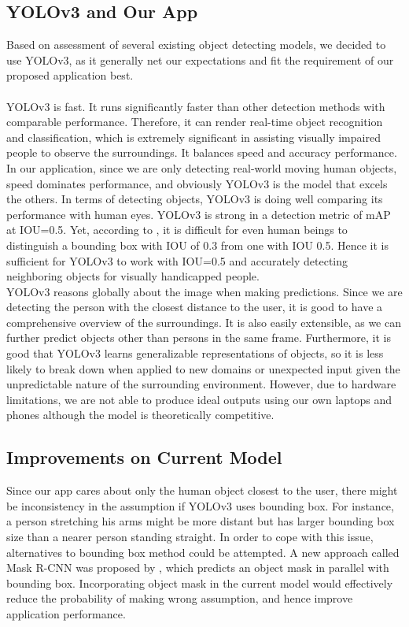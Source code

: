 \documentclass[letterpaper]{article} %
\begin{document}
\subsection{YOLOv3 and Our App}
Based on assessment of several existing object detecting models, we decided to use YOLOv3, as it generally net our expectations and fit the requirement of our proposed application best.\\
\\
\noindent YOLOv3 is fast. It runs significantly faster than other detection methods with comparable performance. Therefore, it can render real-time object recognition and classification, which is extremely significant in assisting visually impaired people to observe the surroundings. It balances speed and accuracy performance. In our application, since we are only detecting real-world moving human objects, speed dominates performance, and obviously YOLOv3 is the model that excels the others. In terms of detecting objects, YOLOv3 is doing well comparing its performance with human eyes. YOLOv3 is strong in a detection metric of mAP at IOU=0.5. Yet, according to \cite{Human-machine}, it is difficult for even human beings to distinguish a bounding box with IOU of 0.3 from one with IOU 0.5. Hence it is sufficient for YOLOv3 to work with IOU=0.5 and accurately detecting neighboring objects for visually handicapped people.\\

\noindent YOLOv3 reasons globally about the image when making predictions\cite{YOLOv3}. Since we are detecting the person with the closest distance to the user, it is good to have a comprehensive overview of the surroundings. It is also easily extensible, as we can further predict objects other than persons in the same frame. Furthermore, it is good that YOLOv3 learns generalizable representations of objects, so it is less likely to break down when applied to new domains or unexpected input given the unpredictable nature of the surrounding environment. \cite{YOLOv3} However, due to hardware limitations, we are not able to produce ideal outputs using our own laptops and phones although the model is theoretically competitive.

\subsection{Improvements on Current Model}
Since our app cares about only the human object closest to the user, there might be inconsistency in the assumption if YOLOv3 uses bounding box. For instance, a person stretching his arms might be more distant but has larger bounding box size than a nearer person standing straight. In order to cope with this issue, alternatives to bounding box method could be attempted. A new approach called Mask R-CNN was proposed by \cite{Mask-RCNN}, which predicts an object mask in parallel with bounding box. Incorporating object mask in the current model would effectively reduce the probability of making wrong assumption, and hence improve application performance.
\end{document}
